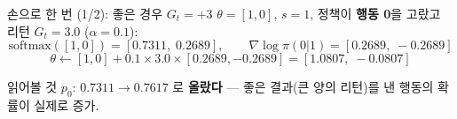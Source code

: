 \begin{frame}{손으로 한 번 (1/2): 좋은 경우 $G_t = +3$}
  $\theta=[1,0]$, $s=1$, 정책이 \textbf{행동 0}을 고랐고
  리턴 $G_t = 3.0$ ($\alpha = 0.1$):
  \[
  \text{softmax}([1,0]) = [0.7311,\; 0.2689],
  \qquad
  \nabla\log\pi(0|1) = [0.2689,\; -0.2689]
  \]
  \[
  \theta \leftarrow [1,0] + 0.1 \times 3.0 \times [0.2689, -0.2689]
  = [1.0807,\; -0.0807]
  \]
  \begin{block}{읽어볼 것}
    $p_0$: $0.7311 \to \mathbf{0.7617}$ 로 \textbf{올랐다} ---
    좋은 결과(큰 양의 리턴)를 낸 행동의 확률이 실제로 증가.
  \end{block}
\end{frame}
